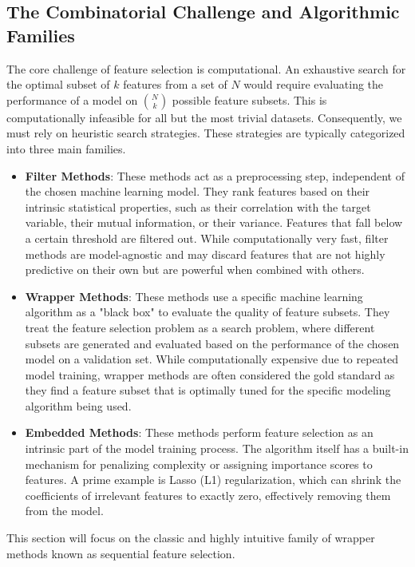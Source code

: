\subsection{The Combinatorial Challenge and Algorithmic Families}
The core challenge of feature selection is computational. An exhaustive search for the optimal subset of $k$ features from a set of $N$ would require evaluating the performance of a model on $\binom{N}{k}$ possible feature subsets. This is computationally infeasible for all but the most trivial datasets. Consequently, we must rely on heuristic search strategies. These strategies are typically categorized into three main families.

\begin{itemize}
    \item \textbf{Filter Methods}: These methods act as a preprocessing step, independent of the chosen machine learning model. They rank features based on their intrinsic statistical properties, such as their correlation with the target variable, their mutual information, or their variance. Features that fall below a certain threshold are filtered out. While computationally very fast, filter methods are model-agnostic and may discard features that are not highly predictive on their own but are powerful when combined with others.
    
    \item \textbf{Wrapper Methods}: These methods use a specific machine learning algorithm as a "black box" to evaluate the quality of feature subsets. They treat the feature selection problem as a search problem, where different subsets are generated and evaluated based on the performance of the chosen model on a validation set. While computationally expensive due to repeated model training, wrapper methods are often considered the gold standard as they find a feature subset that is optimally tuned for the specific modeling algorithm being used.
    
    \item \textbf{Embedded Methods}: These methods perform feature selection as an intrinsic part of the model training process. The algorithm itself has a built-in mechanism for penalizing complexity or assigning importance scores to features. A prime example is Lasso (L1) regularization, which can shrink the coefficients of irrelevant features to exactly zero, effectively removing them from the model.
\end{itemize}

This section will focus on the classic and highly intuitive family of wrapper methods known as sequential feature selection.

